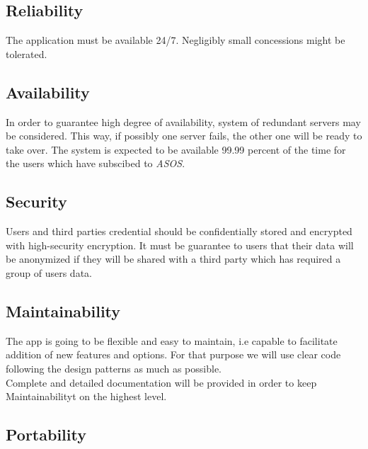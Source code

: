 \subsection{Reliability}
The application must be available 24/7. Negligibly small concessions might be tolerated.

\subsection{Availability}
In order to guarantee high degree of availability, system of redundant servers may be considered. This way, if possibly one server fails, the other one will be ready to take over.  The system is expected to be available 99.99 percent of the time for the users which have subscibed to \textit{ASOS}.

\subsection{Security}
Users and third parties credential should be confidentially stored and encrypted with high-security encryption. It must be guarantee to users that their data will be anonymized if they will be shared with a third party which has required a group of users data.

\subsection{Maintainability}
The app is going to be flexible and easy to maintain, i.e capable to facilitate addition of new features and options. For that purpose we will use clear code following the design patterns as much as possible. \\
Complete and detailed documentation will be provided in order to keep Maintainabilityt on the highest level.

\subsection{Portability}